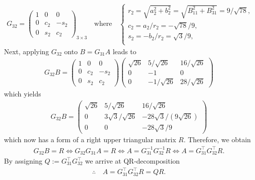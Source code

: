 \documentclass[12pt]{article}
\begin{document}
\begin{align}
	G_{32} = \begin{pmatrix}  1 &0 &0 \\ 0 &c_2 &-s_2 \\ 0 &s_2 &c_2 \end{pmatrix}_{3\times 3}
	\quad
	\text{where}
	\quad
	\begin{cases}
		r_2 = \sqrt{a_2^2+b_2^2} = \sqrt{B_{11}^2 + B_{31}^2} = 9/\sqrt{78}, \\
		c_2 =  a_2/r_2 = -\sqrt{78}/9,                                       \\
		s_2 = -b_2/r_2 = \sqrt{3}/9,                                         \\
	\end{cases}
\end{align}
Next, applying $G_{32}$ onto $B=G_{31}A$ leads to 
\begin{align}
	G_{32}B =  
	\begin{pmatrix}  1 &0 &0 \\ 0 &c_2 &-s_2 \\ 0 &s_2 &c_2 \end{pmatrix}
	\begin{pmatrix} \sqrt{26} &5/\sqrt{26} &16/\sqrt{26} \\ 0 &-1 &0 \\ 0 &-1/\sqrt{26} &28/\sqrt{26} \end{pmatrix}
\end{align}
which yields
\begin{align}
	G_{32}B =  
	\begin{pmatrix} \sqrt{26} &5/\sqrt{26} &16/\sqrt{26} \\ 0 &3\sqrt{3}/\sqrt{26} &-28\sqrt{3}/(9\sqrt{26}) \\ 0 &0 &-28\sqrt{3}/9 \end{pmatrix}
\end{align}
which now has a form of a right upper triangular matrix $R$. Therefore, we obtain
\begin{align}
	G_{32}B = R 
	\Leftrightarrow
	G_{32}G_{31}A = R 
	\Leftrightarrow
	A = G_{31}^{-1}G_{32}^{-1}R
	\Leftrightarrow
	A = G_{31}^{\top}G_{32}^{\top}R.
\end{align}
By assigning $Q:=G_{31}^{\top}G_{32}^{\top}$ we arrive at QR-decomposition
\begin{align*}
	\therefore\quad\boxed{
	A = G_{31}^{\top}G_{32}^{\top}R = QR.
	}
\end{align*}
\end{document}
